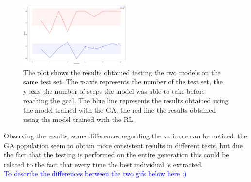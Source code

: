 \begin{figure}[H]
	\centering
	\includegraphics [width=0.5\textwidth]{Images/GAvRL_backup.png}
	\caption{The plot shows the results obtained testing the two models on the same test set. The x-axis represents the number of the test set, the y-axis the number of steps the model was able to take before reaching the goal. The blue line represents the results obtained using the model trained with the GA, the red line the results obtained using the model trained with the RL.}
	\label{figRLvsGA}
\end{figure}

Observing the results, some differences regarding the variance can be noticed: the GA population seem to obtain more consistent results in different tests, but due the fact that the testing is performed on the entire generation this could be related to the fact that every time the best individual is extracted.\\
	
\textcolor{blue}{To describe the differences between the two gifs below here :)}
	
